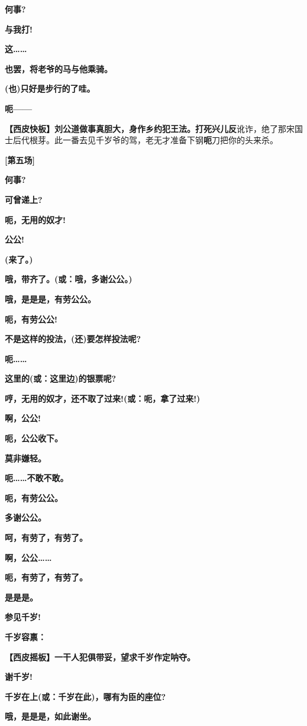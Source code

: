 \textbf{何事?}

\textbf{与我打!}

\textbf{这\ldots{}\ldots{}}

\textbf{也罢，将老爷的马与他乘骑。}

\textbf{(也)只好是步行的了哇。}

\textbf{呃------}

\textbf{【西皮快板】刘公道做事真胆大，身作乡约犯王法。打死兴儿反}讹诈，绝了那宋国士后代根芽。此一番去见千岁爷的驾，老无才准备下钢\textbf{呃}刀把你的头来杀。

\textbf{{[}第五场{]}}

\textbf{何事?}

\textbf{可曾递上?}

\textbf{呃，无用的奴才!}

\textbf{公公!}

\textbf{(来了。)}

\textbf{哦，带齐了。(或：哦，多谢公公。)}

\textbf{哦，是是是，有劳公公。}

\textbf{呃，有劳公公!}

\textbf{不是这样的投法，(还)要怎样投法呢?}

\textbf{呃\ldots{}\ldots{}}

\textbf{这里的(或：这里边)的银票呢?}

\textbf{哼，无用的奴才，还不取了过来!(或：呃，拿了过来!)}

\textbf{啊，公公!}

\textbf{呃，公公收下。}

\textbf{莫非嫌轻。}

\textbf{呃\ldots{}\ldots{}不敢不敢。}

\textbf{呃，有劳公公。}

\textbf{多谢公公。}

\textbf{呵，有劳了，有劳了。}

\textbf{啊，公公\ldots{}\ldots{}}

\textbf{呃，有劳了，有劳了。}

\textbf{是是是。}

\textbf{参见千岁!}

\textbf{千岁容禀：}

\textbf{【西皮摇板】一干人犯俱带妥，望求千岁作定呐夺。}

\textbf{谢千岁!}

\textbf{千岁在上(或：千岁在此)，哪有为臣的座位?}

\textbf{哦，是是是，如此谢坐。}

